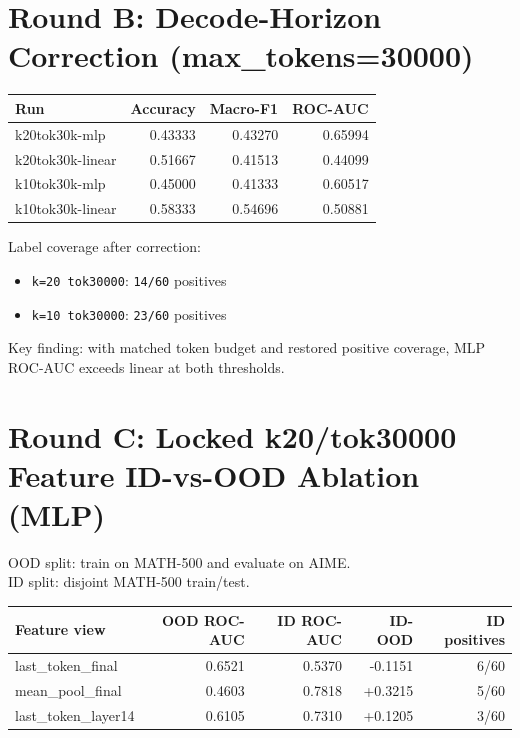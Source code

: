 \documentclass[11pt]{article}
\begin{document}
\section*{Round B: Decode-Horizon Correction (max\_tokens=30000)}
\begin{center}
\begin{tabular}{@{}lrrr@{}}
\toprule
Run & Accuracy & Macro-F1 & ROC-AUC \\
\midrule
k20tok30k-mlp & 0.43333 & 0.43270 & 0.65994 \\
k20tok30k-linear & 0.51667 & 0.41513 & 0.44099 \\
k10tok30k-mlp & 0.45000 & 0.41333 & 0.60517 \\
k10tok30k-linear & 0.58333 & 0.54696 & 0.50881 \\
\bottomrule
\end{tabular}
\end{center}

\noindent
Label coverage after correction:
\begin{itemize}
  \item \texttt{k=20 tok30000}: \texttt{14/60} positives
  \item \texttt{k=10 tok30000}: \texttt{23/60} positives
\end{itemize}

\noindent
Key finding: with matched token budget and restored positive coverage, MLP ROC-AUC exceeds linear at both thresholds.

\section*{Round C: Locked k20/tok30000 Feature ID-vs-OOD Ablation (MLP)}
OOD split: train on MATH-500 and evaluate on AIME.\\
ID split: disjoint MATH-500 train/test.

\begin{center}
\begin{tabular}{@{}lrrrr@{}}
\toprule
Feature view & OOD ROC-AUC & ID ROC-AUC & ID-OOD & ID positives \\
\midrule
last\_token\_final & 0.6521 & 0.5370 & -0.1151 & 6/60 \\
mean\_pool\_final & 0.4603 & 0.7818 & +0.3215 & 5/60 \\
last\_token\_layer14 & 0.6105 & 0.7310 & +0.1205 & 3/60 \\
\bottomrule
\end{tabular}
\end{center}
\end{document}
